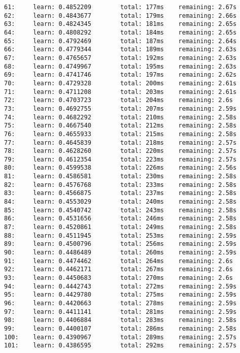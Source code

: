 \documentclass[11pt]{article}
\begin{document}
\begin{Verbatim}[commandchars=\\\{\}]
61:     learn: 0.4852209        total: 177ms    remaining: 2.67s
62:     learn: 0.4843677        total: 179ms    remaining: 2.66s
63:     learn: 0.4824345        total: 181ms    remaining: 2.65s
64:     learn: 0.4808292        total: 184ms    remaining: 2.65s
65:     learn: 0.4792469        total: 187ms    remaining: 2.64s
66:     learn: 0.4779344        total: 189ms    remaining: 2.63s
67:     learn: 0.4765657        total: 192ms    remaining: 2.63s
68:     learn: 0.4749967        total: 195ms    remaining: 2.63s
69:     learn: 0.4741746        total: 197ms    remaining: 2.62s
70:     learn: 0.4729328        total: 200ms    remaining: 2.61s
71:     learn: 0.4711208        total: 203ms    remaining: 2.61s
72:     learn: 0.4703723        total: 204ms    remaining: 2.6s
73:     learn: 0.4692755        total: 207ms    remaining: 2.59s
74:     learn: 0.4682292        total: 210ms    remaining: 2.58s
75:     learn: 0.4667540        total: 212ms    remaining: 2.58s
76:     learn: 0.4655933        total: 215ms    remaining: 2.58s
77:     learn: 0.4645839        total: 218ms    remaining: 2.57s
78:     learn: 0.4628260        total: 220ms    remaining: 2.57s
79:     learn: 0.4612354        total: 223ms    remaining: 2.57s
80:     learn: 0.4599538        total: 226ms    remaining: 2.56s
81:     learn: 0.4586581        total: 230ms    remaining: 2.58s
82:     learn: 0.4576768        total: 233ms    remaining: 2.58s
83:     learn: 0.4566875        total: 237ms    remaining: 2.58s
84:     learn: 0.4553029        total: 240ms    remaining: 2.58s
85:     learn: 0.4540742        total: 243ms    remaining: 2.58s
86:     learn: 0.4531656        total: 246ms    remaining: 2.58s
87:     learn: 0.4520861        total: 249ms    remaining: 2.58s
88:     learn: 0.4511945        total: 253ms    remaining: 2.59s
89:     learn: 0.4500796        total: 256ms    remaining: 2.59s
90:     learn: 0.4486489        total: 260ms    remaining: 2.59s
91:     learn: 0.4474462        total: 264ms    remaining: 2.6s
92:     learn: 0.4462171        total: 267ms    remaining: 2.6s
93:     learn: 0.4450683        total: 270ms    remaining: 2.6s
94:     learn: 0.4442743        total: 272ms    remaining: 2.59s
95:     learn: 0.4429780        total: 275ms    remaining: 2.59s
96:     learn: 0.4420663        total: 278ms    remaining: 2.59s
97:     learn: 0.4411141        total: 281ms    remaining: 2.59s
98:     learn: 0.4406884        total: 283ms    remaining: 2.58s
99:     learn: 0.4400107        total: 286ms    remaining: 2.58s
100:    learn: 0.4390967        total: 289ms    remaining: 2.57s
101:    learn: 0.4386595        total: 292ms    remaining: 2.57s

\end{Verbatim}
\end{document}

